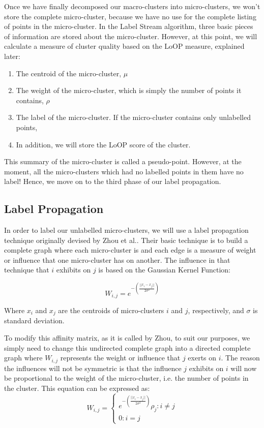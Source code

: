 \documentclass[12pt,a4paper,oneside]{report}
\begin{document}
Once we have finally decomposed our macro-clusters into micro-clusters, we won't store the complete micro-cluster, because we have no use for the complete listing of points in the micro-cluster. In the Label Stream algorithm, three basic pieces of information are stored about the micro-cluster. However, at this point, we will calculate a measure of cluster quality based on the LoOP measure, explained later:
\begin{enumerate}
\item The centroid of the micro-cluster, \(\mu\)
\item The weight of the micro-cluster, which is simply the number of points it contains, \(\rho\)
\item The label of the micro-cluster. If the micro-cluster contains only unlabelled points,  
\item In addition, we will store the LoOP score of the cluster. 
\end{enumerate}

This summary of the micro-cluster is called a pseudo-point. However, at the moment, all the micro-clusters which had no labelled points in them have no label! Hence, we move on to the third phase of our label propagation. 

\subsection{Label Propagation}

In order to label our unlabelled micro-clusters, we will use a label propagation technique originally devised by Zhou et al.\cite{LabProp}. Their basic technique is to build a complete graph where each micro-cluster is and each edge is a measure of weight or influence that one micro-cluster has on another. The influence in that technique that \(i\) exhibits on \(j\) is based on the Gaussian Kernel Function:

\[W_{i,j} = e^{-(\frac{||x_i-x_j||}{2\sigma^2})}\]

Where \(x_i\) and \(x_j\) are the centroids of micro-clusters \(i\) and \(j\), respectively, and $\sigma$ is standard deviation. 

To modify this affinity matrix, as it is called by Zhou, to suit our purposes, we simply need to change this undirected complete graph into a directed complete graph where \(W_{i,j}\) represents the weight or influence that \(j\) exerts on \(i\). The reason the influences will not be symmetric is that the influence \(j\) exhibits on \(i\) will now be proportional to the weight of the micro-cluster, i.e. the number of points in the cluster. This equation can be expressed as:
\[
	W_{i,j} =
	\begin{cases}
	 e^{-(\frac{||x_i-x_j||}{2\sigma^2})}\rho_j : i \neq j \\
	0 :					 i  = j 
\end{cases}\] 
\end{document}
